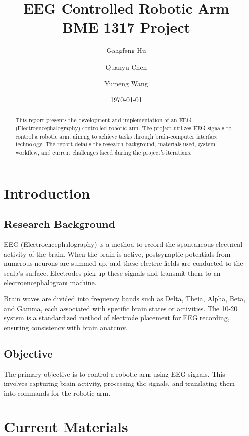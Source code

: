 \documentclass[12pt]{report}
\title{EEG Controlled Robotic Arm \\ \large{BME 1317 Project}}
\author{Gangfeng Hu \and Quanyu Chen \and Yumeng Wang}
\date{\today}
\begin{document}
\maketitle

\begin{abstract}
This report presents the development and implementation of an EEG (Electroencephalography) controlled robotic arm. The project utilizes EEG signals to control a robotic arm, aiming to achieve tasks through brain-computer interface technology. The report details the research background, materials used, system workflow, and current challenges faced during the project's iterations.
\end{abstract}

\tableofcontents


\chapter{Introduction}
\section{Research Background}
EEG (Electroencephalography) is a method to record the spontaneous electrical activity of the brain. When the brain is active, postsynaptic potentials from numerous neurons are summed up, and these electric fields are conducted to the scalp's surface. Electrodes pick up these signals and transmit them to an electroencephalogram machine.

Brain waves are divided into frequency bands such as Delta, Theta, Alpha, Beta, and Gamma, each associated with specific brain states or activities. The 10-20 system is a standardized method of electrode placement for EEG recording, ensuring consistency with brain anatomy.

\section{Objective}
The primary objective is to control a robotic arm using EEG signals. This involves capturing brain activity, processing the signals, and translating them into commands for the robotic arm.

\chapter{Current Materials}
\end{document}
